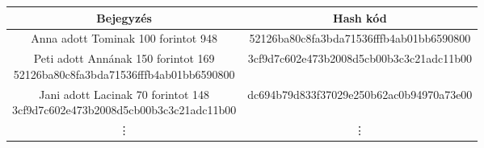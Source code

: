 \documentclass[11pt,a4paper]{article}
\begin{document}
\begin{center}
\begin{tabular}{c|c}
Bejegyzés & Hash kód \\
\hline \hline
Anna adott Tominak 100 forintot 948 & \scriptsize{52126ba80c8fa3bda71536fffb4ab01bb6590800} \\
\hline
\makecell{Peti adott Annának 150 forintot 169 \\ \scriptsize{52126ba80c8fa3bda71536fffb4ab01bb6590800}} & \scriptsize{3cf9d7c602e473b2008d5cb00b3c3c21adc11b00} \\
\hline
\makecell{Jani adott Lacinak 70 forintot 148 \\ \scriptsize{3cf9d7c602e473b2008d5cb00b3c3c21adc11b00}} & \scriptsize{dc694b79d833f37029e250b62ac0b94970a73e00} \\ 
\hline
\vdots & \vdots
\end{tabular}
\end{center}
\end{document}
